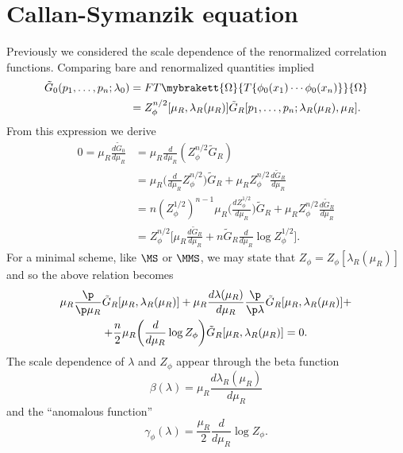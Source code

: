 \section{Callan-Symanzik equation}
Previously we considered the scale dependence of the renormalized correlation functions. Comparing bare and renormalized quantities implied 
\begin{equation}
    \begin{split}
        \tilde{G}_0(p_1,\dots,p_n;\lambda_0) & =FT\mybrakett{\Omega}{T\{\phi_0(x_1)\cdots\phi_0(x_n)\}}{\Omega} \\
        &= Z_\phi^{n/2}[\mu_R,\lambda_R(\mu_R)]\tilde{G}_R[p_1,\dots,p_n;\lambda_R(\mu_R),\mu_R].
    \end{split}
\end{equation}
From this expression we derive 
\begin{equation}
    \begin{split}
        0 = \mu_R\frac{d\tilde{G}_0}{d\mu_R} &= \mu_R\frac{d}{d\mu_R}(Z_\phi^{n/2}\tilde{G}_R) \\
        &= \mu_R\bigg(\frac{d}{d\mu_R}Z_\phi^{n/2}\bigg)\tilde{G}_R + \mu_RZ_\phi^{n/2}\frac{d\tilde{G}_R}{d\mu_R} \\
        &= n(Z^{1/2}_\phi)^{n-1}\mu_R\bigg(\frac{dZ_\phi^{1/2}}{d\mu_R}\bigg)\tilde{G}_R + \mu_RZ_\phi^{n/2}\frac{d\tilde{G}_R}{d\mu_R} \\
        &= Z_\phi^{n/2}\bigg[\mu_R\frac{d\tilde{G}_R}{d\mu_R} + n\tilde{G}_R\frac{d}{d\mu_R}\log{Z_\phi^{1/2}}\bigg].
    \end{split}
\end{equation}
For a minimal scheme, like $\MS$ or $\MMS$, we may state that $Z_\phi = Z_\phi[\lambda_R(\mu_R)]$ and so the above relation becomes
\begin{multline}
    \mu_R\frac{\p}{\p\mu_R}\tilde{G}_R[\mu_R,\lambda_R(\mu_R)] + \mu_R\frac{d\lambda(\mu_R)}{d\mu_R}\frac{\p}{\p\lambda}\tilde{G}_R[\mu_R,\lambda_R(\mu_R)] + \\
    + \frac{n}{2}\mu_R\bigg(\frac{d}{d\mu_R}\log{Z_\phi}\bigg)\tilde{G}_R[\mu_R,\lambda_R(\mu_R)] = 0.
\end{multline}
The scale dependence of $\lambda$ and $Z_\phi$ appear through the beta function
\begin{equation}
    \beta(\lambda) = \mu_R\frac{d\lambda_R(\mu_R)}{d\mu_R}
\end{equation}
and the ``anomalous function''
\begin{equation}
    \gamma_\phi(\lambda) = \frac{\mu_R}{2}\frac{d}{d\mu_R}\log{Z_\phi}.
\end{equation}
